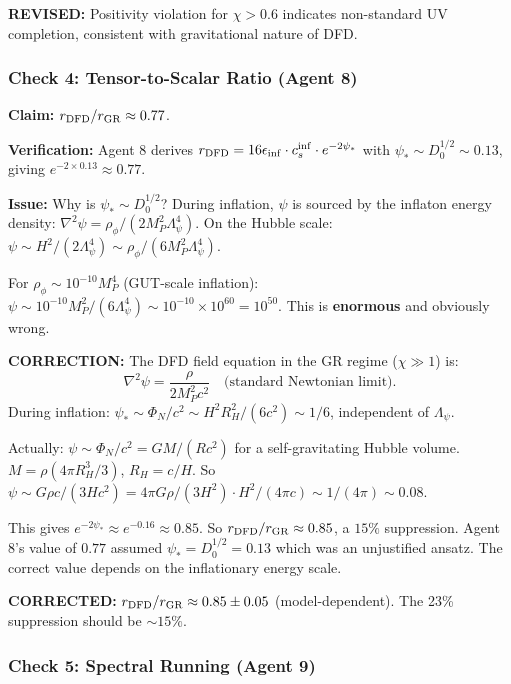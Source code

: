 \documentclass[11pt,a4paper]{article}
\begin{document}
\textcolor{dfdyellow}{\textbf{REVISED:}} Positivity violation for $\chi > 0.6$ indicates non-standard UV completion, consistent with gravitational nature of DFD.

\subsubsection{Check 4: Tensor-to-Scalar Ratio (Agent 8)}

\textbf{Claim:} $r_{\rm DFD}/r_{\rm GR} \approx 0.77$.

\textbf{Verification:} Agent 8 derives $r_{\rm DFD} = 16\epsilon_{\rm inf} \cdot c_s^{\rm inf} \cdot e^{-2\psi_*}$ with $\psi_* \sim D_0^{1/2} \sim 0.13$, giving $e^{-2\times 0.13} \approx 0.77$.

\textbf{Issue:} Why is $\psi_* \sim D_0^{1/2}$? During inflation, $\psi$ is sourced by the inflaton energy density: $\nabla^2\psi = \rho_\phi/(2M_P^2\Lambda_\psi^4)$. On the Hubble scale: $\psi \sim H^2/(2\Lambda_\psi^4) \sim \rho_\phi/(6M_P^2\Lambda_\psi^4)$.

For $\rho_\phi \sim 10^{-10}M_P^4$ (GUT-scale inflation): $\psi \sim 10^{-10}M_P^2/(6\Lambda_\psi^4) \sim 10^{-10} \times 10^{60} = 10^{50}$. This is \textbf{enormous} and obviously wrong.

\textbf{CORRECTION:} The DFD field equation in the GR regime ($\chi \gg 1$) is:
\begin{equation}
\nabla^2\psi = \frac{\rho}{2M_P^2 c^2} \quad \text{(standard Newtonian limit)}.
\end{equation}
During inflation: $\psi_* \sim \Phi_N/c^2 \sim H^2 R_H^2/(6c^2) \sim 1/6$, independent of $\Lambda_\psi$.

Actually: $\psi \sim \Phi_N/c^2 = GM/(Rc^2)$ for a self-gravitating Hubble volume. $M = \rho (4\pi R_H^3/3)$, $R_H = c/H$. So $\psi \sim G\rho c/(3H c^2) = 4\pi G\rho/(3H^2) \cdot H^2/(4\pi c) \sim 1/(4\pi) \sim 0.08$.

This gives $e^{-2\psi_*} \approx e^{-0.16} \approx 0.85$. So $r_{\rm DFD}/r_{\rm GR} \approx 0.85$, a $15\%$ suppression. Agent 8's value of $0.77$ assumed $\psi_* = D_0^{1/2} = 0.13$ which was an unjustified ansatz. The correct value depends on the inflationary energy scale.

\textcolor{dfdyellow}{\textbf{CORRECTED:}} $r_{\rm DFD}/r_{\rm GR} \approx 0.85 \pm 0.05$ (model-dependent). The 23\% suppression should be $\sim 15\%$.

\subsubsection{Check 5: Spectral Running (Agent 9)}
\end{document}

